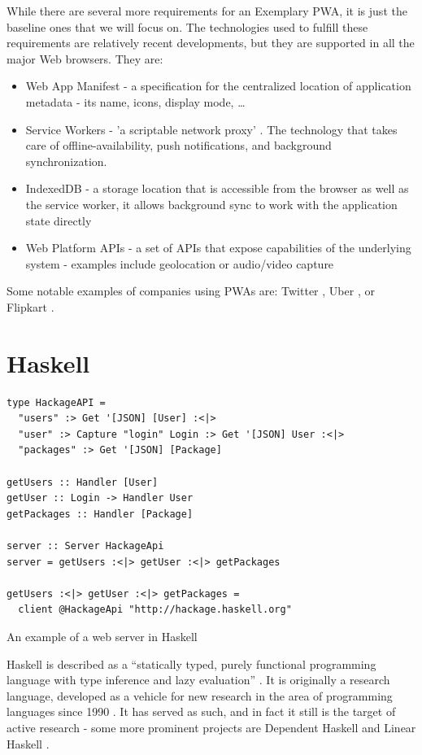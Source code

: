 \documentclass[english,odsaz]{fitthesis}
\begin{document}
While there are several more requirements for an Exemplary PWA, it is just the
baseline ones that we will focus on. The technologies used to fulfill these
requirements are relatively recent developments, but they are supported in all
the major Web browsers. They are:

\begin{itemize}
\item Web App Manifest - a specification for the centralized location of application
metadata - its name, icons, display mode, \ldots{}
\item Service Workers - 'a scriptable network proxy' \cite{mdn_svcwrk}. The
technology that takes care of offline-availability, push notifications, and
background synchronization.
\item IndexedDB - a storage location that is accessible from the browser as well as
the service worker, it allows background sync to work with the application
state directly
\item Web Platform APIs - a set of APIs that expose capabilities of the underlying
system - examples include geolocation or
audio/video capture \cite{what_web_can_do}
\end{itemize}

Some notable examples of companies using PWAs are: Twitter \cite{twitter}, Uber
\cite{uber}, or Flipkart \cite{flipkart}.

\section{Haskell}
\label{sec:org0d33c1b}
\begin{listing}[htbp]
\begin{verbatim}
type HackageAPI =
  "users" :> Get '[JSON] [User] :<|>
  "user" :> Capture "login" Login :> Get '[JSON] User :<|>
  "packages" :> Get '[JSON] [Package]

getUsers :: Handler [User]
getUser :: Login -> Handler User
getPackages :: Handler [Package]

server :: Server HackageApi
server = getUsers :<|> getUser :<|> getPackages

getUsers :<|> getUser :<|> getPackages =
  client @HackageApi "http://hackage.haskell.org"
\end{verbatim}
\caption{An example of a web server in Haskell}
\end{listing}

Haskell is described as a ``statically typed, purely functional programming
language with type inference and lazy evaluation'' \cite{jones2003haskell}. It is
originally a research language, developed as a vehicle for new research in the
area of programming languages since 1990 \cite{haskell_history}. It has served as
such, and in fact it still is the target of active research - some more
prominent projects are Dependent Haskell \cite{eisenberg2016dependent} and Linear
Haskell \cite{bernardy2017linear}.
\end{document}
